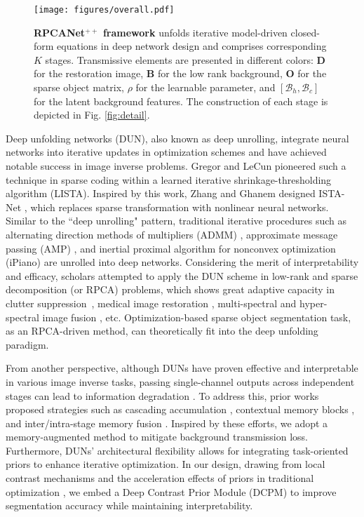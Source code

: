 \documentclass[10pt,journal,compsoc]{IEEEtran}
\begin{document}
\begin{figure*}[!ht]
\setlength{\abovecaptionskip}{1pt}
\setlength{\belowcaptionskip}{0cm}
\centering
\texttt{[image: figures/overall.pdf]}
\caption{\textbf{RPCANet$^{++}$ framework} unfolds iterative model-driven closed-form equations in deep network design and comprises corresponding $K$ stages. Transmissive elements are presented in different colors: $\mathbf{D}$ for the restoration image, $\mathbf{B}$ for the low rank background, $\mathbf{O}$ for the sparse object matrix, $\rho$ for the learnable parameter, and $[\mathcal{B}_h,\mathcal{B}_c]$ for the latent background features. The construction of each stage is depicted in Fig. \ref{fig:detail}.}
\label{fig:overall}
\vspace{-0.4cm}
\end{figure*}
Deep unfolding networks (DUN), also known as deep unrolling, integrate neural networks into iterative updates in optimization schemes and have achieved notable success in image inverse problems. Gregor and LeCun \cite{lecun-2010-lista} pioneered such a technique in sparse coding within a learned iterative shrinkage-thresholding algorithm (LISTA). Inspired by this work, Zhang and Ghanem designed ISTA-Net \cite{zhang-2018-istanet}, which replaces sparse transformation with nonlinear neural networks. Similar to the “deep unrolling" pattern, traditional iterative procedures such as alternating direction methods of multipliers (ADMM) \cite{sun-2016-admmnet}, approximate message passing (AMP) \cite{zhang-2021-ampnet}, and inertial proximal algorithm for nonconvex optimization (iPiano) \cite{su-2020-ipiano} are unrolled into deep networks. Considering the merit of interpretability and efficacy, scholars attempted to apply the DUN scheme in low-rank and sparse decomposition (or RPCA) problems, which shows great adaptive capacity in clutter suppression~\cite{solomon-2020-corona}, medical image restoration \cite{huang-2021-lrps}, multi-spectral and hyper-spectral image fusion \cite{yan-2023-fusion}, etc. Optimization-based sparse object segmentation task, as an RPCA-driven method, can theoretically fit into the deep unfolding paradigm.

From another perspective, although DUNs have proven effective and interpretable in various image inverse tasks, passing single-channel outputs across independent stages can lead to information degradation \cite{zhou-2023-lrsp,zhang-2023-physics}. To address this, prior works proposed strategies such as cascading accumulation \cite{zhang-2023-ctnet}, contextual memory blocks \cite{chen-2020-mem}, and inter/intra-stage memory fusion \cite{song-2021-madun}. Inspired by these efforts, we adopt a memory-augmented method to mitigate background transmission loss. Furthermore, DUNs' architectural flexibility \cite{you-2021-istanetpp} allows for integrating task-oriented priors \cite{zhang-2021-prior,yang-2022-prior,wei-2022-prior,imran-2022-prior} to enhance iterative optimization. In our design, drawing from local contrast mechanisms \cite{yu-2020-cdc} and the acceleration effects of priors in traditional optimization \cite{dai-2017-ript}, we embed a Deep Contrast Prior Module (DCPM) to improve segmentation accuracy while maintaining interpretability.
\end{document}
